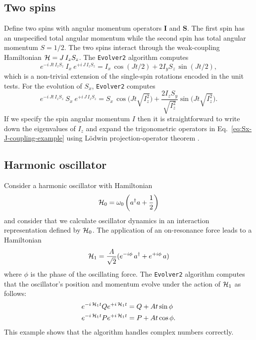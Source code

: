 
\subsection{Two spins}
\label{sec:two-spins}

Define two spins with angular momentum operators $\bm{I}$ and $\bm{S}$.
The first spin has an unspecified total angular momentum while the second spin has total angular momentum $S = 1/2$. The two spins interact through the weak-coupling Hamiltonian ${\cal H} = J\, I_{z} S_{z}$.
The \verb+Evolver2+ algorithm computes
\begin{equation}
e^{-i \, J t \, I_z S_z} 
\: I_x \: 
e^{+i \, J \, I_z S_z} = 
  I_x \, \cos{(J t  \big/ 2 )} 
  + 2 I_y S_z \, \sin{(J t \big/ 2)},
\end{equation}
which is a non-trivial extension of the single-spin rotations encoded in the unit tests.
For the evolution of $S_x$, \verb+Evolver2+ computes
\begin{equation}
e^{-i \, J t \, I_z S_z} 
\: S_x \: 
e^{+i \, J \, I_z S_z} = 
  S_x \, \cos{\big( J t  \sqrt{I_{z}^2} \big)} 
  +  \frac{2 I_z S_y}{\sqrt{I_{z}^2}} \sin{\big(J t \sqrt{I_{z}^2}\big)}.
\label{eq:Sx-J-coupling-example}
\end{equation}
If we specify the spin angular momentum $I$ then it is straightforward to write down the eigenvalues of $I_z$ and expand the trigonometric operators in Eq.~\ref{eq:Sx-J-coupling-example} using L\"{o}dwin projection-operator theorem \cite{Lowdin1955mar}.


\subsection{Harmonic oscillator}
\label{sec:ho}

Consider a harmonic oscillator with Hamiltonian
\begin{equation}
{\cal H}_0 = \omega_0 \left( a^{\dagger} a + \frac{1}{2} \right)
\end{equation}
and consider that we calculate oscillator dynamics in an interaction representation defined by ${\cal H}_0$.
The application of an on-resonance force leads to a Hamiltonian
\begin{equation}
{\cal H}_1 = \frac{A}{\sqrt{2}} (e^{-i \phi} \, a^{\dagger} + e^{+i \phi} \, a)
\end{equation}
where $\phi$ is the phase of the oscillating force.
The \verb+Evolver2+ algorithm computes that the oscillator's position and momentum evolve under the action of ${\cal H}_1$ as follows: 
\begin{subequations}
\begin{align}
e^{-i \, {\cal H}_1  t}  Q e^{+i \, {\cal H}_1  t} & = Q + A t \sin{\phi} \\
e^{-i \, {\cal H}_1  t}  P e^{+i \, {\cal H}_1  t} & = P + A t \cos{\phi}.
\end{align}
\end{subequations}
This example shows that the algorithm handles complex numbers correctly.

